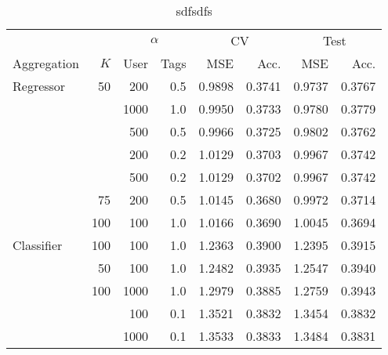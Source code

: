 \begin{table}
\centering
\caption{sdfsdfs}
\label{tab:results.knn}
\begin{tabular}{lrrrrrrr}
\toprule
           &     & \multicolumn{2}{c}{$\alpha$} &  \multicolumn{2}{c}{CV} & \multicolumn{2}{c}{Test} \\
           \cmidrule(lr){3-4}\cmidrule(lr){5-6}\cmidrule(l){7-8}
Aggregation & $K$ & User & Tags &  MSE & Acc. & MSE & Acc.  \\
\midrule
Regressor & 50  & 200  & 0.5 &  0.9898 &      0.3741 &   0.9737 &        0.3767 \\
           &     & 1000 & 1.0 &  0.9950 &      0.3733 &   0.9780 &        0.3779 \\
           &     & 500  & 0.5 &  0.9966 &      0.3725 &   0.9802 &        0.3762 \\
           &     & 200  & 0.2 &  1.0129 &      0.3703 &   0.9967 &        0.3742 \\
           &     & 500  & 0.2 &  1.0129 &      0.3702 &   0.9967 &        0.3742 \\
           & 75  & 200  & 0.5 &  1.0145 &      0.3680 &   0.9972 &        0.3714 \\
           & 100 & 100  & 1.0 &  1.0166 &      0.3690 &   1.0045 &        0.3694 \\
Classifier & 100 & 100  & 1.0 &  1.2363 &      0.3900 &   1.2395 &        0.3915 \\
           & 50  & 100  & 1.0 &  1.2482 &      0.3935 &   1.2547 &        0.3940 \\
           & 100 & 1000 & 1.0 &  1.2979 &      0.3885 &   1.2759 &        0.3943 \\
           &     & 100  & 0.1 &  1.3521 &      0.3832 &   1.3454 &        0.3832 \\
           &     & 1000 & 0.1 &  1.3533 &      0.3833 &   1.3484 &        0.3831 \\
\bottomrule
\end{tabular}
\end{table}

